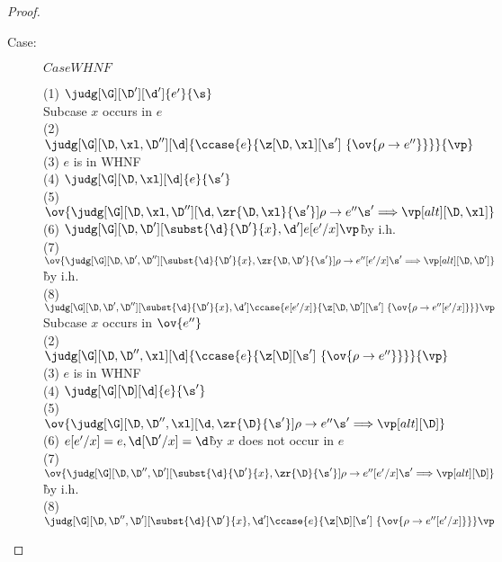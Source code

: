 \begin{proof}
\begin{description}
\item[Case:] $CaseWHNF$
\begin{tabbing}
  (1) $\judg[\G][\D'][\d']{e'}{\s}$\\
  Subcase $x$ occurs in $e$\\
  (2) $\judg[\G][\D,\xl,\D''][\d]{\ccase{e}{\z[\D,\xl][\s']~\{\ov{\rho\to e''}\}}}{\vp}$\\
  (3) $e$ is in WHNF\\
  (4) $\judg[\G][\D,\xl][\d]{e}{\s'}$\\
  (5) $\ov{\judg[\G][\D,\xl,\D''][\d,\zr{\D,\xl}{\s'}]{\rho\to e''}{\s' \Longrightarrow \vp}[alt][\D,\xl]}$\\
  (6) $\judg[\G][\D,\D'][\subst{\d}{\D'}{x}, \d']{e[e'/x]}{\vp}$\`by i.h.\\
  (7) $\ov{\judg[\G][\D,\D',\D''][\subst{\d}{\D'}{x},\zr{\D,\D'}{\s'}]{\rho\to e''[e'/x]}{\s' \Longrightarrow \vp}[alt][\D,\D']}$\` by i.h.\\
  (8) $\judg[\G][\D,\D',\D''][\subst{\d}{\D'}{x},\d']{\ccase{e[e'/x]}{\z[\D,\D'][\s']~\{\ov{\rho\to e''[e'/x]}\}}}{\vp}$\\
  Subcase $x$ occurs in $\ov{e''}$\\
  (2) $\judg[\G][\D,\D'',\xl][\d]{\ccase{e}{\z[\D][\s']~\{\ov{\rho\to e''}\}}}{\vp}$\\
  (3) $e$ is in WHNF\\
  (4) $\judg[\G][\D][\d]{e}{\s'}$\\
  (5) $\ov{\judg[\G][\D,\D'',\xl][\d,\zr{\D}{\s'}]{\rho\to e''}{\s' \Longrightarrow \vp}[alt][\D]}$\\
  (6) $e[e'/x] = e, \d[\D'/x]=\d$\` by $x$ does not occur in $e$\\
  (7) $\ov{\judg[\G][\D,\D'',\D'][\subst{\d}{\D'}{x},\zr{\D}{\s'}]{\rho\to e''[e'/x]}{\s' \Longrightarrow \vp}[alt][\D]}$\`by i.h.\\
  (8) $\judg[\G][\D,\D'',\D'][\subst{\d}{\D'}{x},\d']{\ccase{e}{\z[\D][\s']~\{\ov{\rho\to e''[e'/x]}\}}}{\vp}$\\
\end{tabbing}


\end{description}
\end{proof}

